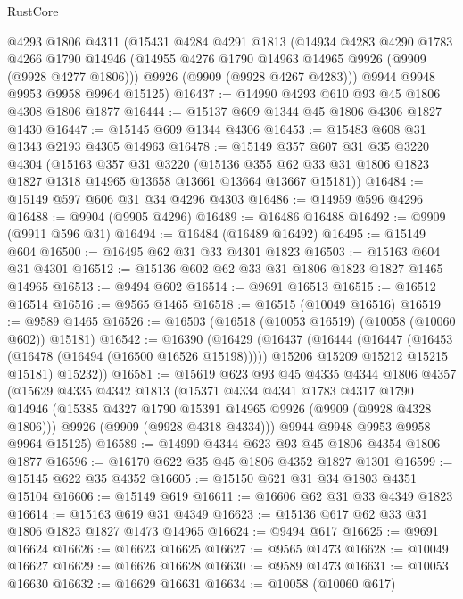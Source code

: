 \begin{lexlean}{RustCore}
\begin{coremodule}
    @4293
    @1806
    @4311
    (@15431
      @4284
      @4291
      @1813
      (@14934
        @4283
        @4290
        @1783
        @4266
        @1790
        @14946
        (@14955 @4276 @1790 @14963 @14965 @9926 (@9909 (@9928 @4277 @1806)))
        @9926
        (@9909 (@9928 @4267 @4283)))
      @9944
      @9948
      @9953
      @9958
      @9964
      @15125)
@16437 := @14990 @4293 @610 @93 @45 @1806 @4308 @1806 @1877
@16444 := @15137 @609 @1344 @45 @1806 @4306 @1827 @1430
@16447 := @15145 @609 @1344 @4306
@16453 := @15483 @608 @31 @1343 @2193 @4305 @14963
@16478 := @15149
    @357
    @607
    @31
    @35
    @3220
    @4304
    (@15163
      @357
      @31
      @3220
      (@15136 @355 @62 @33 @31 @1806 @1823 @1827 @1318 @14965 @13658 @13661 @13664 @13667 @15181))
@16484 := @15149 @597 @606 @31 @34 @4296 @4303
@16486 := @14959 @596 @4296
@16488 := @9904 (@9905 @4296)
@16489 := @16486 @16488
@16492 := @9909 (@9911 @596 @31)
@16494 := @16484 (@16489 @16492)
@16495 := @15149 @604
@16500 := @16495 @62 @31 @33 @4301 @1823
@16503 := @15163 @604 @31 @4301
@16512 := @15136 @602 @62 @33 @31 @1806 @1823 @1827 @1465 @14965
@16513 := @9494 @602
@16514 := @9691 @16513
@16515 := @16512 @16514
@16516 := @9565 @1465
@16518 := @16515 (@10049 @16516)
@16519 := @9589 @1465
@16526 := @16503 (@16518 (@10053 @16519) (@10058 (@10060 @602)) @15181)
@16542 := @16390
    (@16429
      (@16437
        (@16444
          (@16447 (@16453 (@16478 (@16494 (@16500 @16526 @15198)))))
          @15206
          @15209
          @15212
          @15215
          @15181)
        @15232))
@16581 := @15619
    @623
    @93
    @45
    @4335
    @4344
    @1806
    @4357
    (@15629
      @4335
      @4342
      @1813
      (@15371
        @4334
        @4341
        @1783
        @4317
        @1790
        @14946
        (@15385 @4327 @1790 @15391 @14965 @9926 (@9909 (@9928 @4328 @1806)))
        @9926
        (@9909 (@9928 @4318 @4334)))
      @9944
      @9948
      @9953
      @9958
      @9964
      @15125)
@16589 := @14990 @4344 @623 @93 @45 @1806 @4354 @1806 @1877
@16596 := @16170 @622 @35 @45 @1806 @4352 @1827 @1301
@16599 := @15145 @622 @35 @4352
@16605 := @15150 @621 @31 @34 @1803 @4351 @15104
@16606 := @15149 @619
@16611 := @16606 @62 @31 @33 @4349 @1823
@16614 := @15163 @619 @31 @4349
@16623 := @15136 @617 @62 @33 @31 @1806 @1823 @1827 @1473 @14965
@16624 := @9494 @617
@16625 := @9691 @16624
@16626 := @16623 @16625
@16627 := @9565 @1473
@16628 := @10049 @16627
@16629 := @16626 @16628
@16630 := @9589 @1473
@16631 := @10053 @16630
@16632 := @16629 @16631
@16634 := @10058 (@10060 @617)

\end{coremodule}
\end{lexlean}
